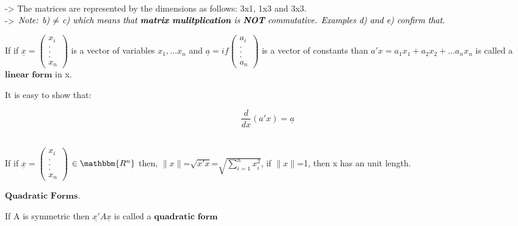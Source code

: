 \documentclass[]{article}
\begin{document}
-\textgreater{} The matrices are represented by the dimensions as
follows: 3x1, 1x3 and 3x3.\\

-\textgreater{}
\(\text{\textit{Note: b) $\neq$ c) which means that $\textbf{matrix mulitplication}$ is  $\textbf{NOT}$ commutative. Examples d) and e) confirm that.}}\)\\[2\baselineskip]

\begin{tcolorbox}[colback=green!5,colframe=red!40!black,title=Definition (Linear Forms)]
If if $\underline{x}=\begin{pmatrix} x_i \\ .\\ .\\.\\x_n  \end{pmatrix}$ is a vector of variables $x_1, ...x_n$ and $\underline{a}=if \begin{pmatrix} a_i \\ .\\ .\\.\\a_n  \end{pmatrix}$ is a vector of constants than $a'x=a_1x_1+a_2x_2+...a_nx_n$ is called a $\textbf{linear form}$ in x.



\end{tcolorbox}

It is easy to show that:

\[\frac{d}{dx}(a'x)=\underline{a}\]\\

\begin{tcolorbox}[colback=green!5,colframe=red!40!black,title=Definition (Length of a vector)]
If if $\underline{x}=\begin{pmatrix} x_i \\ .\\ .\\.\\x_n  \end{pmatrix}$ $\in \mathbbm{R^n}$ then, $\|x\|$=$\sqrt{x'x}$=$\sqrt{\sum\limits_{i=1}^n x^2_i}$, if $\|x\|$=1, then x has an unit length.




\end{tcolorbox}

\(\textbf{Quadratic Forms}\).

If A is symmetric then \(\underline{x'}A\underline{x}\) is called a
\(\textbf{quadratic form}\)\\
\end{document}
